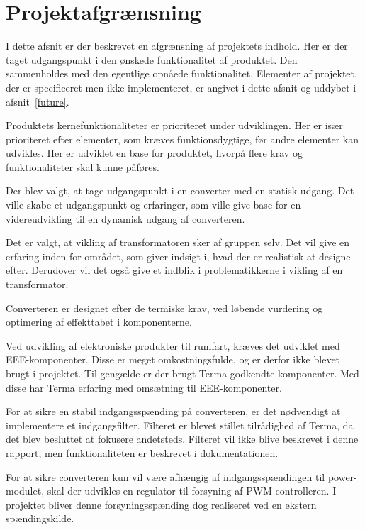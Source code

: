
\chapter{Projektafgrænsning}
I dette afsnit er der beskrevet en afgrænsning af projektets indhold. Her er der taget udgangspunkt i den ønskede funktionalitet af produktet. Den sammenholdes med den egentlige opnåede funktionalitet. Elementer af projektet, der er specificeret men ikke implementeret, er angivet i dette afsnit og uddybet i afsnit~\ref{future}. 

Produktets kernefunktionaliteter er prioriteret under udviklingen. Her er især prioriteret efter elementer, som kræves funktionsdygtige, før andre elementer kan udvikles. Her er udviklet en base for produktet, hvorpå flere krav og funktionaliteter skal kunne påføres.

Der blev valgt, at tage udgangspunkt i en converter med en statisk udgang. Det ville skabe et udgangspunkt og erfaringer, som ville give base for en videreudvikling til en dynamisk udgang af converteren.  

Det er valgt, at vikling af transformatoren sker af gruppen selv. Det vil give en erfaring inden for området, som giver indsigt i, hvad der er realistisk at designe efter. Derudover vil det også give et indblik i problematikkerne i vikling af en transformator. 

Converteren er designet efter de termiske krav, ved løbende vurdering og optimering af effekttabet i komponenterne.

Ved udvikling af elektroniske produkter til rumfart, kræves det udviklet med EEE-komponenter. Disse er meget omkostningsfulde, og er derfor ikke blevet brugt i projektet. Til gengælde er der brugt Terma-godkendte komponenter. Med disse har Terma erfaring med omsætning til EEE-komponenter.  

For at sikre en stabil indgangsspænding på converteren, er det nødvendigt at implementere et indgangsfilter. Filteret er blevet stillet tilrådighed af Terma, da det blev besluttet at fokusere andetsteds. Filteret vil ikke blive beskrevet i denne rapport, men funktionaliteten er beskrevet i dokumentationen.

For at sikre converteren kun vil være afhængig af indgangsspændingen til power-modulet, skal der udvikles en regulator til forsyning af PWM-controlleren. I projektet bliver denne forsyningsspænding dog realiseret ved en ekstern spændingskilde. 




